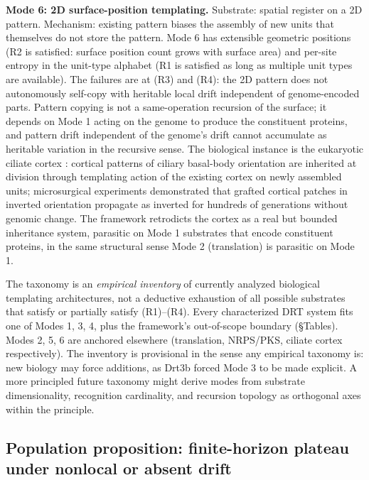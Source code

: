 \documentclass[aps,prx,reprint,amsmath,amssymb,floatfix,superscriptaddress,nofootinbib]{revtex4-2}
\theoremstyle{plain-thm}
\theoremstyle{definition-thm}
\begin{document}
\textbf{Mode 6: 2D surface-position templating.} Substrate: spatial register on a 2D pattern. Mechanism: existing pattern biases the assembly of new units that themselves do not store the pattern. Mode 6 has extensible geometric positions (R2 is satisfied: surface position count grows with surface area) and per-site entropy in the unit-type alphabet (R1 is satisfied as long as multiple unit types are available). The failures are at (R3) and (R4): the 2D pattern does not autonomously self-copy with heritable local drift independent of genome-encoded parts. Pattern copying is not a same-operation recursion of the surface; it depends on Mode 1 acting on the genome to produce the constituent proteins, and pattern drift independent of the genome's drift cannot accumulate as heritable variation in the recursive sense. The biological instance is the eukaryotic ciliate cortex \citep{BeissonSonneborn1965, Frankel1989}: cortical patterns of ciliary basal-body orientation are inherited at division through templating action of the existing cortex on newly assembled units; microsurgical experiments demonstrated that grafted cortical patches in inverted orientation propagate as inverted for hundreds of generations without genomic change. The framework retrodicts the cortex as a real but bounded inheritance system, parasitic on Mode 1 substrates that encode constituent proteins, in the same structural sense Mode 2 (translation) is parasitic on Mode 1.

The taxonomy is an \emph{empirical inventory} of currently analyzed biological templating architectures, not a deductive exhaustion of all possible substrates that satisfy or partially satisfy (R1)--(R4). Every characterized DRT system fits one of Modes 1, 3, 4, plus the framework's out-of-scope boundary (\S Tables). Modes 2, 5, 6 are anchored elsewhere (translation, NRPS/PKS, ciliate cortex respectively). The inventory is provisional in the sense any empirical taxonomy is: new biology may force additions, as Drt3b forced Mode 3 to be made explicit. A more principled future taxonomy might derive modes from substrate dimensionality, recognition cardinality, and recursion topology as orthogonal axes within the principle.

\subsection{Population proposition: finite-horizon plateau under nonlocal or absent drift}
\end{document}
